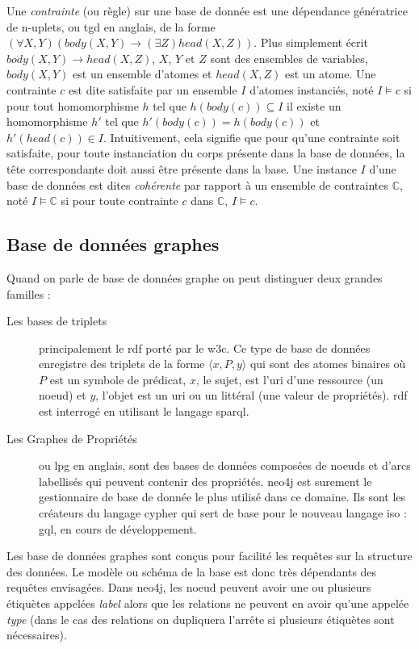 Une \textit{contrainte} (ou règle) sur une base de donnée est une dépendance génératrice de n-uplets, ou \gls{tgd} en anglais, de la forme $(\forall X, Y)(body(X, Y) \to (\exists Z)head(X, Z))$.
Plus simplement écrit $body(X, Y) \to head(X, Z)$, $X$, $Y$ et $Z$ sont des ensembles de variables, $body(X, Y)$ est un ensemble d'atomes et $head(X, Z)$ est un atome.
Une contrainte $c$ est dite satisfaite par un ensemble $I$ d'atomes instanciés, noté $I \vDash c$ si pour tout homomorphisme $h$ tel que $h(body(c)) \subseteq I$ il existe un homomorphisme $h'$ tel que $h'(body(c)) = h(body(c))$ et $h'(head(c)) \in I$.
Intuitivement, cela signifie que pour qu'une contrainte soit satisfaite, pour toute instanciation du corps présente dans la base de données, la tête correspondante doit aussi être présente dans la base.
Une instance $I$ d'une base de données est dites \textit{cohérente} par rapport à un ensemble de contraintes $\mathbb{C}$, noté $I \vDash \mathbb{C}$ si pour toute contrainte $c$ dans $\mathbb{C}$, $I \vDash c$.

\subsection{Base de données graphes}
\label{sec:update:pre:graph}

Quand on parle de base de données graphe on peut distinguer deux grandes familles :
\begin{description}
    \item[Les bases de triplets] principalement le \gls{rdf} porté par le \gls{w3c}.
        Ce type de base de données enregistre des triplets de la forme $\langle x, P, y \rangle$ qui sont des atomes binaires où $P$ est un symbole de prédicat, $x$, le sujet, est l'\gls{uri} d'une ressource (un noeud) et $y$, l'objet est un \gls{uri} ou un littéral (une valeur de propriétés).
        \gls{rdf} est interrogé en utilisant le langage \gls{sparql}.
    \item[Les Graphes de Propriétés] ou \gls{lpg} en anglais, sont des bases de données composées de noeuds et d'arcs labellisés qui peuvent contenir des propriétés.
        \gls{neo4j} est surement le gestionnaire de base de donnée le plus utilisé dans ce domaine.
        Ils sont les créateurs du langage \gls{cypher} qui sert de base pour le nouveau langage \gls{iso} : \gls{gql}, en cours de développement.
\end{description}

Les base de données graphes sont conçus pour facilité les requêtes sur la structure des données.
Le modèle ou schéma de la base est donc très dépendants des requêtes envisagées.
Dans \gls{neo4j}, les noeud peuvent avoir une ou plusieurs étiquètes appelées \textit{label} alors que les relations ne peuvent en avoir qu'une appelée \textit{type} (dans le cas des relations on dupliquera l'arrête si plusieurs étiquètes sont nécessaires).

